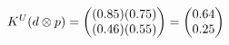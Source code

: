 \documentclass[preview]{standalone}
\begin{document}
\begin{align*}
\special{dvisvgm:raw <g id='unique000'>}K^U(d \otimes p) = \begin{pmatrix} (0.85)(0.75) \\ (0.46)(0.55) \end{pmatrix} = \begin{pmatrix} 0.64 \\ 0.25 \end{pmatrix}\special{dvisvgm:raw </g>}
\end{align*}
\end{document}
